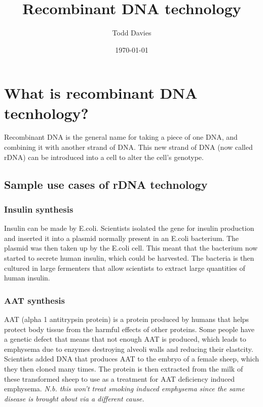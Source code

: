 \documentclass{article}
\title{Recombinant DNA technology}
\author{Todd Davies}
\date{\today}
\begin{document}
\lhead{\today}

\maketitle

\section*{What is recombinant DNA tecnhology?}
\thispagestyle{empty}
Recombinant DNA is the general name for taking a piece of one DNA, and combining
it with another strand of DNA. This new strand of DNA (now called rDNA) can be introduced into a cell to alter the cell's genotype.

\subsection*{Sample use cases of rDNA technology}
\subsubsection*{Insulin synthesis}
Insulin can be made by E.coli. Scientists isolated the gene for insulin
production and inserted it into a plasmid normally present in an E.coli
bacterium. The plasmid was then taken up by the E.coli cell. This meant that the bacterium now started to secrete human insulin, which could be harvested. The bacteria is then cultured in large fermenters that allow scientists to extract
large quantities of human insulin.

\subsubsection*{AAT synthesis}
AAT (alpha 1 antitrypsin protein) is a protein produced by humans that helps
protect body tissue from the harmful effects of other proteins. Some people have
a genetic defect that means that not enough AAT is produced, which leads to emphysema due to enzymes destroying alveoli walls and reducing their elastcity. Scientists added DNA that produces AAT to the embryo of a female sheep, which
they then cloned many times. The protein is then extracted from the milk of
these transformed sheep to use as a treatment for AAT deficiency induced
emphysema. {\it N.b. this won't treat smoking induced emphysema since the same disease is brought about via a different cause.}
\end{document}
